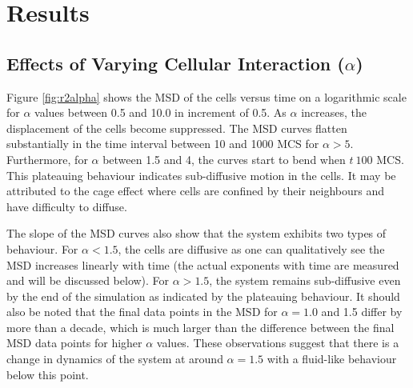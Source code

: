 \documentclass[a4paper,12pt]{article}
\begin{document}
\section{Results}
\subsection{Effects of Varying Cellular Interaction ($\alpha$)}
Figure \ref{fig:r2alpha} shows the MSD of the cells versus time on a logarithmic scale for $\alpha$ values between 0.5 and 10.0 in increment of 0.5. As $\alpha$ increases, the displacement of the cells become suppressed. The MSD curves flatten substantially in the time interval between 10 and 1000 MCS for $\alpha > 5$. Furthermore, for $\alpha$ between 1.5 and 4, the curves start to bend when $t ~ 100$ MCS. This plateauing behaviour indicates sub-diffusive motion in the cells. It may be attributed to the cage effect where cells are confined by their neighbours and have difficulty to diffuse. 

The slope of the MSD curves also show that the system exhibits two types of behaviour. For $\alpha < 1.5$, the cells are diffusive as one can qualitatively see the MSD increases linearly with time (the actual exponents with time are measured and will be discussed below). For $\alpha > 1.5$, the system remains sub-diffusive even by the end of the simulation as indicated by the plateauing behaviour. It should also be noted that the final data points in the MSD for $\alpha = 1.0$ and 1.5 differ by more than a decade, which is much larger than the difference between the final MSD data points for higher $\alpha$ values. These observations suggest that there is a change in dynamics of the system at around $\alpha = 1.5$ with a fluid-like behaviour below this point. 
\end{document}
